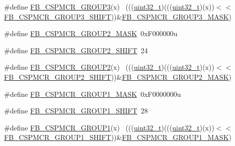 \begin{DoxyCompactItemize}
\item 
\#define \hyperlink{group___f_b___register___masks_gadf0a03bd6ac07968aaa35ad4f6fecfeb}{F\+B\+\_\+\+C\+S\+P\+M\+C\+R\+\_\+\+G\+R\+O\+U\+P3}(x)                                        ~(((\hyperlink{_p_e___types_8h_a33594304e786b158f3fb30289278f5af}{uint32\+\_\+t})(((\hyperlink{_p_e___types_8h_a33594304e786b158f3fb30289278f5af}{uint32\+\_\+t})(x))$<$$<$\hyperlink{group___f_b___register___masks_ga9f0b849b6cb1a2f629dcd23a0a0a4306}{F\+B\+\_\+\+C\+S\+P\+M\+C\+R\+\_\+\+G\+R\+O\+U\+P3\+\_\+\+S\+H\+I\+FT}))\&\hyperlink{group___f_b___register___masks_gac53d0fcbc3464725ceda1d20147fe98c}{F\+B\+\_\+\+C\+S\+P\+M\+C\+R\+\_\+\+G\+R\+O\+U\+P3\+\_\+\+M\+A\+SK})
\item 
\#define \hyperlink{group___f_b___register___masks_ga594596b281baba23e03cb37fbf0a05db}{F\+B\+\_\+\+C\+S\+P\+M\+C\+R\+\_\+\+G\+R\+O\+U\+P2\+\_\+\+M\+A\+SK}~0x\+F000000u
\item 
\#define \hyperlink{group___f_b___register___masks_ga332a2c4e7103b2f21af54da036518928}{F\+B\+\_\+\+C\+S\+P\+M\+C\+R\+\_\+\+G\+R\+O\+U\+P2\+\_\+\+S\+H\+I\+FT}~24
\item 
\#define \hyperlink{group___f_b___register___masks_ga28e850f531a9d3b6c9415983a5f5727f}{F\+B\+\_\+\+C\+S\+P\+M\+C\+R\+\_\+\+G\+R\+O\+U\+P2}(x)                                        ~(((\hyperlink{_p_e___types_8h_a33594304e786b158f3fb30289278f5af}{uint32\+\_\+t})(((\hyperlink{_p_e___types_8h_a33594304e786b158f3fb30289278f5af}{uint32\+\_\+t})(x))$<$$<$\hyperlink{group___f_b___register___masks_ga332a2c4e7103b2f21af54da036518928}{F\+B\+\_\+\+C\+S\+P\+M\+C\+R\+\_\+\+G\+R\+O\+U\+P2\+\_\+\+S\+H\+I\+FT}))\&\hyperlink{group___f_b___register___masks_ga594596b281baba23e03cb37fbf0a05db}{F\+B\+\_\+\+C\+S\+P\+M\+C\+R\+\_\+\+G\+R\+O\+U\+P2\+\_\+\+M\+A\+SK})
\item 
\#define \hyperlink{group___f_b___register___masks_ga735fd2a0040e9ad1122a3c3fc8e28193}{F\+B\+\_\+\+C\+S\+P\+M\+C\+R\+\_\+\+G\+R\+O\+U\+P1\+\_\+\+M\+A\+SK}~0x\+F0000000u
\item 
\#define \hyperlink{group___f_b___register___masks_ga9c83850dcb3efe92a0404101e5afbdca}{F\+B\+\_\+\+C\+S\+P\+M\+C\+R\+\_\+\+G\+R\+O\+U\+P1\+\_\+\+S\+H\+I\+FT}~28
\item 
\#define \hyperlink{group___f_b___register___masks_ga9a5a66bff196c0cdfac5a0b293e5ca6a}{F\+B\+\_\+\+C\+S\+P\+M\+C\+R\+\_\+\+G\+R\+O\+U\+P1}(x)                                        ~(((\hyperlink{_p_e___types_8h_a33594304e786b158f3fb30289278f5af}{uint32\+\_\+t})(((\hyperlink{_p_e___types_8h_a33594304e786b158f3fb30289278f5af}{uint32\+\_\+t})(x))$<$$<$\hyperlink{group___f_b___register___masks_ga9c83850dcb3efe92a0404101e5afbdca}{F\+B\+\_\+\+C\+S\+P\+M\+C\+R\+\_\+\+G\+R\+O\+U\+P1\+\_\+\+S\+H\+I\+FT}))\&\hyperlink{group___f_b___register___masks_ga735fd2a0040e9ad1122a3c3fc8e28193}{F\+B\+\_\+\+C\+S\+P\+M\+C\+R\+\_\+\+G\+R\+O\+U\+P1\+\_\+\+M\+A\+SK})
\end{DoxyCompactItemize}


